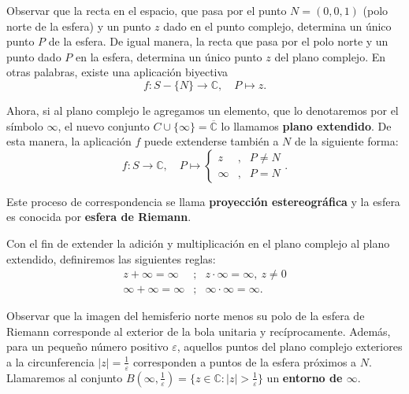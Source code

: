 Observar que la recta en el espacio, que pasa por el punto $N = (0,0,1)$ (polo norte de la esfera) y un punto $z$ dado en el punto complejo, determina un único punto $P$ de la esfera. De igual manera, la recta que pasa por el polo norte y un punto dado $P$ en la esfera, determina un único punto $z$ del plano complejo. En otras palabras, existe una aplicación biyectiva
$$f: S - \{N\} \longrightarrow \mathbb{C}, \quad P \mapsto z.$$

Ahora, si al plano complejo le agregamos un elemento, que lo denotaremos por el símbolo $\infty$, el nuevo conjunto $C \cup \{\infty\} = \overline{\mathbb{C}}$ lo llamamos \textbf{plano extendido}. De esta manera, la aplicación $f$ puede extenderse también a $N$ de la siguiente forma:
$$f: S  \longrightarrow \mathbb{C}, \quad P \mapsto \left\{ \begin{array}{ccl}
z &,& P \neq N \\
\infty &,& P = N
\end{array} \right. .$$

Este proceso de correspondencia se llama \textbf{proyección estereográfica} y la esfera es conocida por \textbf{esfera de Riemann}.

Con el fin de extender la adición y multiplicación en el plano complejo al plano extendido, definiremos las siguientes reglas:
\begin{eqnarray*}
z + \infty = \infty &;& z \cdot \infty = \infty,  ~ z \neq 0\\
\infty + \infty = \infty &;& \infty \cdot \infty = \infty.
\end{eqnarray*}

Observar que la imagen del hemisferio norte menos su polo de la esfera de Riemann corresponde al exterior de la bola unitaria y recíprocamente. Además, para un pequeño número positivo $\varepsilon$, aquellos puntos del plano complejo exteriores a la circunferencia $|z| = \frac{1}{\varepsilon}$  corresponden a puntos de la esfera próximos a $N$. Llamaremos al conjunto $B(\infty, \frac{1}{\varepsilon}) = \{z \in \mathbb{C} : |z| > \frac{1}{\varepsilon}\}$ un \textbf{entorno de $\infty$}.